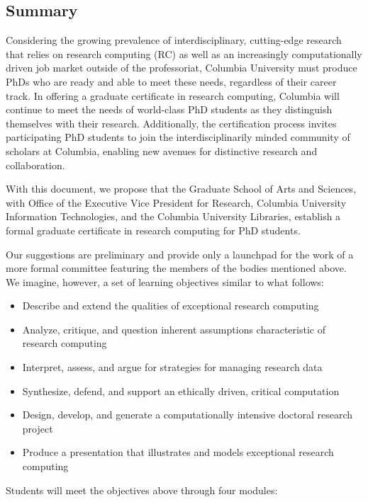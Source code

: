 \documentclass[%
  ,
  article,
  ,
  oneside
  ]{memoir}
\begin{document}
\hypertarget{summary}{%
\subsection{Summary}\label{summary}}

Considering the growing prevalence of interdisciplinary, cutting-edge
research that relies on research computing (RC) as well as an
increasingly computationally driven job market outside of the
professoriat, Columbia University must produce PhDs who are ready and
able to meet these needs, regardless of their career track. In offering
a graduate certificate in research computing, Columbia will continue to
meet the needs of world-class PhD students as they distinguish
themselves with their research. Additionally, the certification process
invites participating PhD students to join the interdisciplinarily
minded community of scholars at Columbia, enabling new avenues for
distinctive research and collaboration.

With this document, we propose that the Graduate School of Arts and
Sciences, with Office of the Executive Vice President for Research,
Columbia University Information Technologies, and the Columbia
University Libraries, establish a formal graduate certificate in
research computing for PhD students.

Our suggestions are preliminary and provide only a launchpad for the
work of a more formal committee featuring the members of the bodies
mentioned above. We imagine, however, a set of learning objectives
similar to what follows:

\begin{itemize}
\tightlist
\item
  Describe and extend the qualities of exceptional research computing
\item
  Analyze, critique, and question inherent assumptions characteristic of
  research computing
\item
  Interpret, assess, and argue for strategies for managing research data
\item
  Synthesize, defend, and support an ethically driven, critical
  computation
\item
  Design, develop, and generate a computationally intensive doctoral
  research project
\item
  Produce a presentation that illustrates and models exceptional
  research computing
\end{itemize}

Students will meet the objectives above through four modules:
\end{document}
